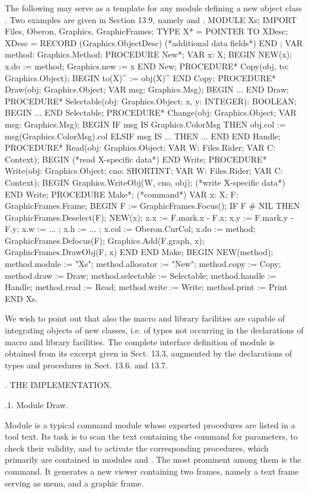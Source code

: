 The following may serve as a template for any module defining a new object class . Two examples are given in Section 13.9, namely  and .
\begintt
MODULE Xs;
IMPORT Files, Oberon, Graphics, GraphicFrames;
TYPE X* = POINTER TO XDesc;
XDesc = RECORD (Graphics.ObjectDesc) (*additional data fields*) END ;
VAR method: Graphics.Method;
PROCEDURE New*; VAR x: X;
BEGIN NEW(x); x.do := method; Graphics.new := x END New;
PROCEDURE* Copy(obj, to: Graphics.Object); BEGIN to(X)^ := obj(X)^
END Copy;
PROCEDURE* Draw(obj: Graphics.Object; VAR msg: Graphics.Msg); BEGIN ...
END Draw;
PROCEDURE* Selectable(obj: Graphics.Object; x, y: INTEGER): BOOLEAN; BEGIN ...
END Selectable;
PROCEDURE* Change(obj: Graphics.Object; VAR msg: Graphics.Msg); BEGIN
IF msg IS Graphics.ColorMsg THEN obj.col := msg(Graphics.ColorMsg).col ELSIF msg IS ... THEN ...
END
END Handle;
PROCEDURE* Read(obj: Graphics.Object; VAR W: Files.Rider; VAR C: Context); BEGIN (*read X-specific data*)
END Write;
PROCEDURE* Write(obj: Graphics.Object; cno: SHORTINT; VAR W: Files.Rider; VAR C: Context);
BEGIN Graphics.WriteObj(W, cno, obj); (*write X-specific data*) END Write;
PROCEDURE Make*; (*command*) VAR x: X; F: GraphicFrames.Frame;
BEGIN F := GraphicFrames.Focus(); IF F # NIL THEN
GraphicFrames.Deselect(F);
NEW(x); x.x := F.mark.x - F.x; x.y := F.mark.y - F.y; x.w := ... ; x.h := ... ;
x.col := Oberon.CurCol; x.do := method;
GraphicFrames.Defocus(F); Graphics.Add(F.graph, x); GraphicFrames.DrawObj(F, x)
END END Make;
BEGIN NEW(method); method.module := "Xs"; method.allocator := "New";
method.copy := Copy; method.draw := Draw; method.selectable := Selectable; method.handle := Handle; method.read := Read; method.write := Write; method.print := Print
END Xs.
\endtt

We wish to point out that also the macro and library facilities are capable of integrating objects of new classes, i.e. of types not occurring in the declarations of macro and library facilities. The complete interface definition of module  is obtained from its excerpt given in Sect. 13.3, augmented by the declarations of types and procedures in Sect. 13.6. and 13.7.

. THE IMPLEMENTATION.

.1. Module Draw.

Module  is a typical command module whose exported procedures are listed in a tool text. Its task is to scan the text containing the command for parameters, to check their validity, and to activate the corresponding procedures, which primarily are contained in modules  and . The most prominent among them is the  command. It generates a new viewer containing two frames, namely a text frame serving as menu, and a graphic frame.

